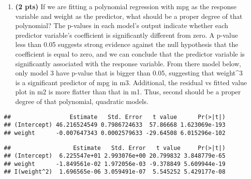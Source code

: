 \documentclass[
]{article}
\newenvironment{Shaded}{\begin{snugshade}}{\end{snugshade}}
\newcommand{\DecValTok}[1]{\textcolor[rgb]{0.00,0.00,0.81}{#1}}
\newcommand{\FunctionTok}[1]{\textcolor[rgb]{0.00,0.00,0.00}{#1}}
\newcommand{\NormalTok}[1]{#1}
\newcommand{\OtherTok}[1]{\textcolor[rgb]{0.56,0.35,0.01}{#1}}
\newcommand{\SpecialCharTok}[1]{\textcolor[rgb]{0.00,0.00,0.00}{#1}}
\providecommand{\tightlist}{%
  \setlength{\itemsep}{0pt}\setlength{\parskip}{0pt}}
\begin{document}
\begin{enumerate}
\def\labelenumi{(\alph{enumi})}
\setcounter{enumi}{5}
\tightlist
\item
  \textbf{(2 pts)} If we are fitting a polynomial regression with mpg as
  the response variable and weight as the predictor, what should be a
  proper degree of that polynomial? The p-values in each model's output
  indicate whether each predictor variable's coefficient is
  significantly different from zero. A p-value less than 0.05 suggests
  strong evidence against the null hypothesis that the coefficient is
  equal to zero, and we can conclude that the predictor variable is
  significantly associated with the response variable. From there model
  below, only model 3 have p-value that is bigger than 0.05, suggesting
  that weight\^{}3 is a significant predictor of mpg in m3. Additional,
  the residual vs fitted value plot in m2 is more flatter than that in
  m1. Thus, second should be a proper degree of that polynomial,
  quadratic models.
\end{enumerate}

\begin{Shaded}
\end{Shaded}

\begin{verbatim}
##                 Estimate   Std. Error   t value      Pr(>|t|)
## (Intercept) 46.216524549 0.7986724633  57.86668 1.623069e-193
## weight      -0.007647343 0.0002579633 -29.64508 6.015296e-102
\end{verbatim}

\begin{Shaded}
\end{Shaded}

\begin{verbatim}
##                  Estimate   Std. Error   t value     Pr(>|t|)
## (Intercept)  6.225547e+01 2.993076e+00 20.799832 3.848779e-65
## weight      -1.849561e-02 1.972056e-03 -9.378849 5.609944e-19
## I(weight^2)  1.696565e-06 3.059491e-07  5.545252 5.429177e-08
\end{verbatim}
\end{document}

